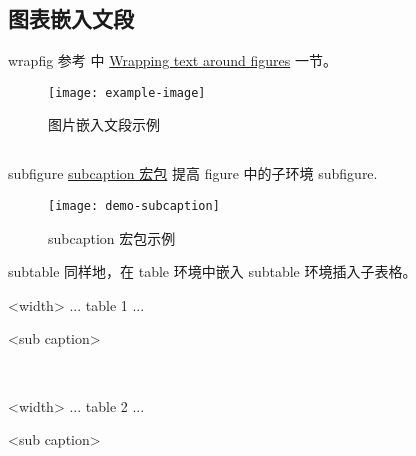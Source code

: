 \documentclass[]{ctexbeamer}
\begin{document}
\subsection{图表嵌入文段}
% 
\begin{frame}[fragile]{wrapfig}
参考 \cite{wiki:floats} 中 \href{https://en.wikibooks.org/wiki/LaTeX/Floats,\_Figures\_and\_Captions\#Wrapping\_text\_around\_figures}{Wrapping text around figures} 一节。
\begin{vertlst}
\small\zhlipsum[2][name=nanshanjing]
\begin{wrapfigure}{r}{.4\textwidth}
  \vspace{-12pt}\centering
  \texttt{[image: example-image]}
  \caption{图片嵌入文段示例}
\end{wrapfigure}
\zhlipsum[3][name=nanshanjing]
\end{vertlst}
\end{frame}


\subsection{}\label{sec:subfloats}
% 
\begin{frame}[fragile]{subfigure}
\href{http://www.ctan.org/pkg/subcaption}{subcaption 宏包} \cite{subcaption} 提高 figure 中的子环境 subfigure.
\end{frame}


\begin{frame}
\begin{figure}[]
  \centering
  \texttt{[image: demo-subcaption]}
  \caption{subcaption 宏包示例}
  \label{demo-subcaption}
\end{figure}
\end{frame}


\begin{frame}[fragile]{subtable}
同样地，在 table 环境中嵌入 subtable 环境插入子表格。
\begin{texlst}
\begin{table}[<placement specifier>]
  \begin{subtable}{<width>}
      \centering
      ... table 1 ...
  \caption{<sub caption>}
  \end{subtable}
  ~
  \begin{subtable}{<width>}
      \centering
      ... table 2 ...
      \caption{<sub caption>}
  \end{subtable}
\end{table}
\end{texlst}
\end{frame}
\end{document}
